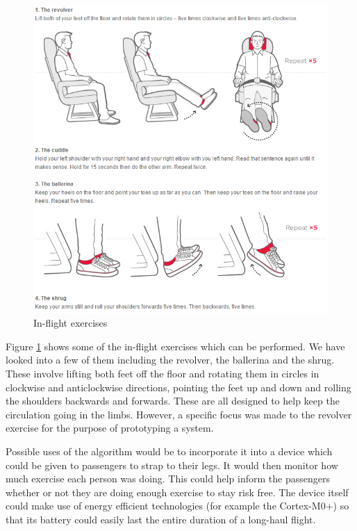 \begin{figure}[h]
  \centering
    \includegraphics[width=1.0\textwidth]{figures/exercises}
  \caption{In-flight exercises \cite{virgin2015exercises}}
  \label{fig:exercises}
\end{figure}

Figure \ref{fig:exercises} shows some of the in-flight exercises which can be performed. We have looked into a few of them including the revolver, the ballerina and the shrug. These involve lifting both feet off the floor and rotating them in circles in clockwise and anticlockwise directions, pointing the feet up and down and rolling the shoulders backwards and forwards. These are all designed to help keep the circulation going in the limbs. However, a specific focus was made to the revolver exercise for the purpose of prototyping a system.

Possible uses of the algorithm would be to incorporate it into a device which could be given to passengers to strap to their legs. It would then monitor how much exercise each person was doing. This could help inform the passengers whether or not they are doing enough exercise to stay risk free. The device itself could make use of energy efficient technologies (for example the Cortex-M0+) so that its battery could easily last the entire duration of a long-haul flight.

